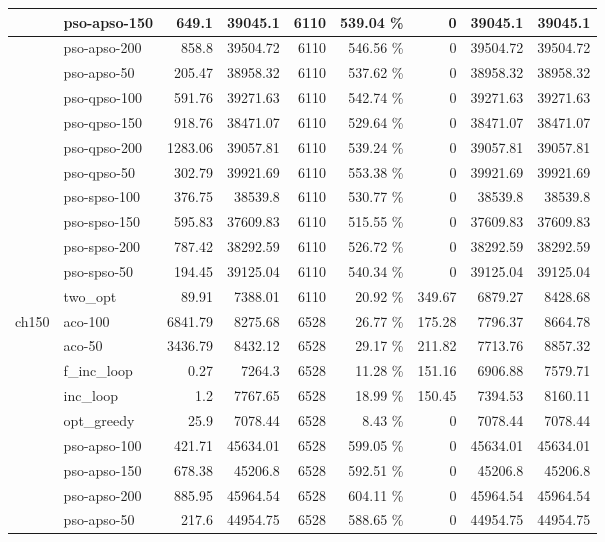 \documentclass[conference]{IEEEtran}
\begin{document}
\begin{center}
\begin{longtable}[ht]{|l|l|r|r|r|r|r|r|r|}
 & pso-apso-150 & 649.1 & 39045.1 & 6110 & 539.04 \% & 0 & 39045.1 & 39045.1 \\ \hline
 & pso-apso-200 & 858.8 & 39504.72 & 6110 & 546.56 \% & 0 & 39504.72 & 39504.72 \\ \hline
 & pso-apso-50 & 205.47 & 38958.32 & 6110 & 537.62 \% & 0 & 38958.32 & 38958.32 \\ \hline
 & pso-qpso-100 & 591.76 & 39271.63 & 6110 & 542.74 \% & 0 & 39271.63 & 39271.63 \\ \hline
 & pso-qpso-150 & 918.76 & 38471.07 & 6110 & 529.64 \% & 0 & 38471.07 & 38471.07 \\ \hline
 & pso-qpso-200 & 1283.06 & 39057.81 & 6110 & 539.24 \% & 0 & 39057.81 & 39057.81 \\ \hline
 & pso-qpso-50 & 302.79 & 39921.69 & 6110 & 553.38 \% & 0 & 39921.69 & 39921.69 \\ \hline
 & pso-spso-100 & 376.75 & 38539.8 & 6110 & 530.77 \% & 0 & 38539.8 & 38539.8 \\ \hline
 & pso-spso-150 & 595.83 & 37609.83 & 6110 & 515.55 \% & 0 & 37609.83 & 37609.83 \\ \hline
 & pso-spso-200 & 787.42 & 38292.59 & 6110 & 526.72 \% & 0 & 38292.59 & 38292.59 \\ \hline
 & pso-spso-50 & 194.45 & 39125.04 & 6110 & 540.34 \% & 0 & 39125.04 & 39125.04 \\ \hline
 & two\_opt & 89.91 & 7388.01 & 6110 & 20.92 \% & 349.67 & 6879.27 & 8428.68 \\ \hline
ch150 & aco-100 & 6841.79 & 8275.68 & 6528 & 26.77 \% & 175.28 & 7796.37 & 8664.78 \\ \hline
 & aco-50 & 3436.79 & 8432.12 & 6528 & 29.17 \% & 211.82 & 7713.76 & 8857.32 \\ \hline
 & f\_inc\_loop & 0.27 & 7264.3 & 6528 & 11.28 \% & 151.16 & 6906.88 & 7579.71 \\ \hline
 & inc\_loop & 1.2 & 7767.65 & 6528 & 18.99 \% & 150.45 & 7394.53 & 8160.11 \\ \hline
 & opt\_greedy & 25.9 & 7078.44 & 6528 & 8.43 \% & 0 & 7078.44 & 7078.44 \\ \hline
 & pso-apso-100 & 421.71 & 45634.01 & 6528 & 599.05 \% & 0 & 45634.01 & 45634.01 \\ \hline
 & pso-apso-150 & 678.38 & 45206.8 & 6528 & 592.51 \% & 0 & 45206.8 & 45206.8 \\ \hline
 & pso-apso-200 & 885.95 & 45964.54 & 6528 & 604.11 \% & 0 & 45964.54 & 45964.54 \\ \hline
 & pso-apso-50 & 217.6 & 44954.75 & 6528 & 588.65 \% & 0 & 44954.75 & 44954.75 \\ \hline

\end{longtable}
\end{center}
\end{document}
